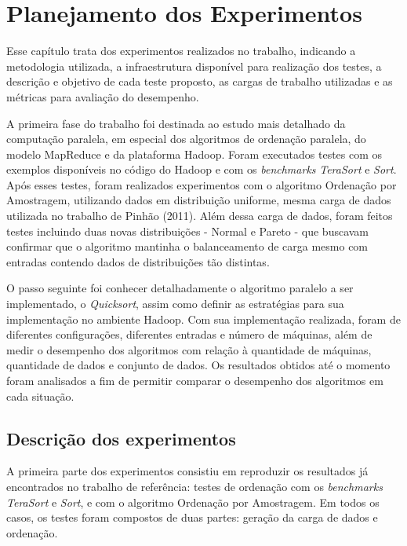 %
%

\chapter{Planejamento dos Experimentos}
\label{cap:planejamentoDosExperimentos}

Esse capítulo trata dos experimentos realizados no trabalho, indicando a metodologia utilizada, a infraestrutura disponível para realização dos testes, a descrição e objetivo de cada teste proposto, as cargas de trabalho utilizadas e as métricas para avaliação do desempenho.



A primeira fase do trabalho foi destinada ao estudo mais detalhado da computação paralela, em especial dos algoritmos de ordenação paralela, do modelo MapReduce e da plataforma Hadoop. Foram executados testes com os exemplos disponíveis no código do Hadoop e com os \textit{benchmarks} \textit{TeraSort} e \textit{Sort}. 
Após esses testes, foram realizados experimentos com o algoritmo Ordenação por Amostragem, utilizando dados em distribuição uniforme, mesma carga de dados utilizada no trabalho de Pinhão (2011). Além dessa carga de dados, foram feitos testes incluindo duas novas distribuições - Normal e Pareto - que buscavam confirmar que o algoritmo mantinha o balanceamento de carga mesmo com entradas contendo dados de distribuições tão distintas. 

O passo seguinte foi conhecer detalhadamente o algoritmo paralelo a ser implementado, o \textit{Quicksort}, assim como definir as estratégias para sua implementação no ambiente Hadoop. 
Com sua implementação realizada, foram 
de diferentes configurações, diferentes entradas e número de máquinas, além de medir o desempenho dos algoritmos com relação à quantidade de máquinas, quantidade de dados e conjunto de dados. Os resultados obtidos até o momento foram analisados a fim de permitir comparar o desempenho dos algoritmos em cada situação.


\section{Descrição dos experimentos}
\label{sec:experimentos}

A primeira parte dos experimentos consistiu em reproduzir os resultados já encontrados no trabalho de referência: testes de ordenação com os \textit{benchmarks TeraSort} e \textit{Sort}, e com o algoritmo Ordenação por Amostragem. 
Em todos os casos, os testes foram compostos de duas partes: geração da carga de dados e ordenação. 

